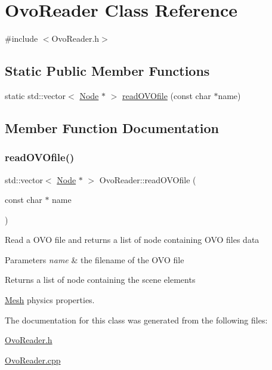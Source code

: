 \hypertarget{classOvoReader}{}\section{Ovo\+Reader Class Reference}
\label{classOvoReader}


{\ttfamily \#include $<$Ovo\+Reader.\+h$>$}

\subsection*{Static Public Member Functions}
\begin{DoxyCompactItemize}
\item 
static std\+::vector$<$ \hyperlink{classNode}{Node} $\ast$ $>$ \hyperlink{classOvoReader_aa914684ac50ca360d93f5234daad3f89}{read\+O\+V\+Ofile} (const char $\ast$name)
\end{DoxyCompactItemize}


\subsection{Member Function Documentation}
\mbox{\label{classOvoReader_aa914684ac50ca360d93f5234daad3f89}} 
\subsubsection{\texorpdfstring{read\+O\+V\+Ofile()}{readOVOfile()}}
{\footnotesize\ttfamily std\+::vector$<$ \hyperlink{classNode}{Node} $\ast$ $>$ Ovo\+Reader\+::read\+O\+V\+Ofile (\begin{DoxyParamCaption}\item[{const char $\ast$}]{name }\end{DoxyParamCaption})\hspace{0.3cm}{\ttfamily [static]}}

Read a O\+VO file and returns a list of node containing O\+VO file\textquotesingle{}s data 
\begin{DoxyParams}{Parameters}
{\em name} & the filename of the O\+VO file \\
\hline
\end{DoxyParams}
\begin{DoxyReturn}{Returns}
a list of node containing the scene elements 
\end{DoxyReturn}
\hyperlink{classMesh}{Mesh} physics properties.

The documentation for this class was generated from the following files\+:\begin{DoxyCompactItemize}
\item 
\hyperlink{OvoReader_8h}{Ovo\+Reader.\+h}\item 
\hyperlink{OvoReader_8cpp}{Ovo\+Reader.\+cpp}\end{DoxyCompactItemize}
